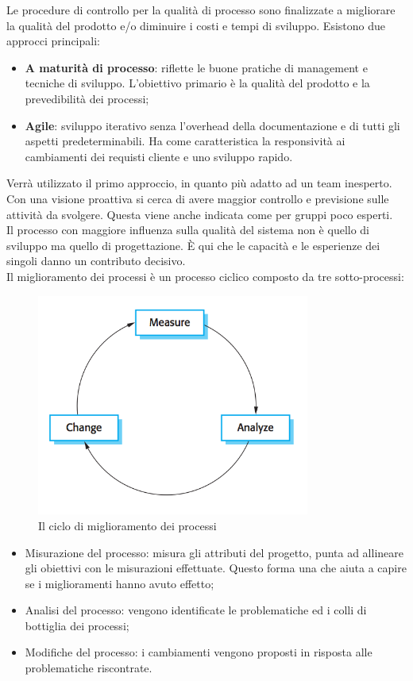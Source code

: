 	Le procedure di controllo per la qualità di processo sono finalizzate a migliorare la qualità del prodotto e/o diminuire i costi e tempi di sviluppo. Esistono due approcci principali:
	\begin{itemize}
		\item \textbf{A maturità di processo}: riflette le buone pratiche di management e tecniche di sviluppo. L'obiettivo primario è la qualità del prodotto e la prevedibilità dei processi;
		\item \textbf{Agile}: sviluppo iterativo senza l'overhead della documentazione e di tutti gli aspetti predeterminabili. Ha come caratteristica la responsività ai cambiamenti dei requisti cliente e uno sviluppo rapido.
	\end{itemize}

	Verrà utilizzato il primo approccio, in quanto più adatto ad un team inesperto. Con una visione proattiva si cerca di avere maggior controllo e previsione sulle attività da svolgere. Questa viene anche indicata come  per gruppi poco esperti.\\
	Il processo con maggiore influenza sulla qualità del sistema non è quello di sviluppo ma quello di progettazione. È qui che le capacità e le esperienze dei singoli danno un contributo decisivo.\\
	Il miglioramento dei processi è un processo ciclico composto da tre sotto-processi:
	
	\begin{figure}[h]
	\centering \includegraphics[width=0.8\textwidth]{ProcessImprovementCycle.png}
	\caption{Il ciclo di miglioramento dei processi}
	\end{figure}

	\begin{itemize}
		\item Misurazione del processo: misura gli attributi del progetto, punta ad allineare gli obiettivi con le misurazioni effettuate. Questo forma una  che aiuta a capire se i miglioramenti hanno avuto effetto;
		\item Analisi del processo: vengono identificate le problematiche ed i colli di bottiglia dei processi;
		\item Modifiche del processo: i cambiamenti vengono proposti in risposta alle problematiche riscontrate.
	\end{itemize}
	
